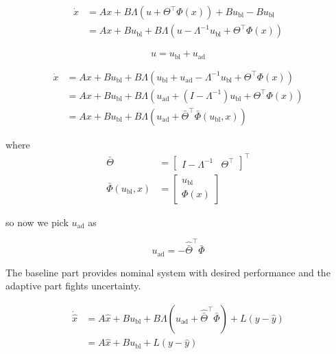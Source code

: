 \begin{equation*}
  \begin{split}
    \dot{x}&=Ax+B\Lambda(u+\Theta^{\top}\Phi(x))+Bu_{\text{bl}}-Bu_{\text{bl}} \\
    &=Ax+Bu_{\text{bl}}+B\Lambda(u-\Lambda^{-1}u_{\text{bl}}+\Theta^{\top}\Phi(x))
  \end{split}
\end{equation*}

\begin{equation*}
  u=u_{\text{bl}}+u_{\text{ad}}
\end{equation*}

\begin{equation*}
  \begin{split}
    \dot{x}&=Ax+Bu_{\text{bl}}+B\Lambda(u_{\text{bl}}+u_{\text{ad}}-\Lambda^{-1}u_{\text{bl}}+\Theta^{\top}\Phi(x)) \\
    &=Ax+Bu_{\text{bl}}+B\Lambda(u_{\text{ad}}+(I-\Lambda^{-1})u_{\text{bl}}+\Theta^{\top}\Phi(x)) \\
    &=Ax+Bu_{\text{bl}}+B\Lambda(u_{\text{ad}}+\bar{\Theta}^{\top}\bar{\Phi}(u_{\text{bl}},x))
  \end{split}
\end{equation*}

where
\begin{equation*}
  \begin{split}
    \bar{\Theta}&=
    \begin{bmatrix}
      I-\Lambda^{-1} & \Theta^{\top}
    \end{bmatrix}^{\top} \\
    \bar{\Phi}(u_{\text{bl}},x)&=
    \begin{bmatrix}
      u_{\text{bl}} \\
      \Phi(x)
    \end{bmatrix}
  \end{split}
\end{equation*}

so now we pick $u_{\text{ad}}$ as

\begin{equation*}
  u_{\text{ad}}=-\hat{\bar{\Theta}}^{\top}\bar{\Phi}
\end{equation*}

The baseline part provides nominal system with desired performance and the adaptive part fights uncertainty.

\begin{equation*}
  \begin{split}
    \dot{\hat{x}}
    &=A\hat{x}+Bu_{\text{bl}}+B\Lambda(u_{\text{ad}}+\hat{\bar{\Theta}}^{\top}\bar{\Phi})+L(y-\hat{y}) \\
    &=A\hat{x}+Bu_{\text{bl}}+L(y-\hat{y})
  \end{split}
\end{equation*}

